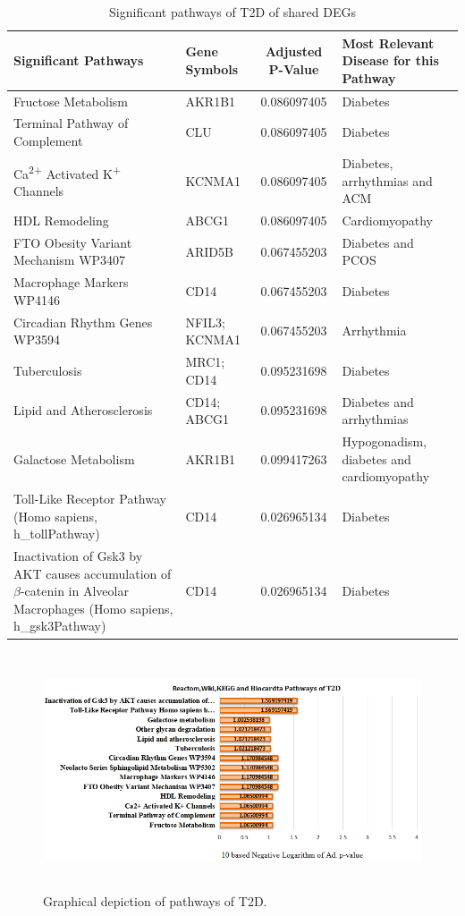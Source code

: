 \begin{table}[H]
\centering
\caption{Significant pathways of T2D of shared DEGs}
\label{tab:T2D_pathways}
\renewcommand{\arraystretch}{1.2} %
\small
\begin{tabularx}{\textwidth}{|X|X|c|X|}
\hline
\textbf{Significant Pathways} & \textbf{Gene Symbols} & \textbf{Adjusted P-Value} & \textbf{Most Relevant Disease for this Pathway} \\
\hline
Fructose Metabolism & AKR1B1 & 0.086097405 & Diabetes \\
\hline
Terminal Pathway of Complement & CLU & 0.086097405 & Diabetes \\
\hline
Ca\textsuperscript{2+} Activated K\textsuperscript{+} Channels & KCNMA1 & 0.086097405 & Diabetes, arrhythmias and ACM \\
\hline
HDL Remodeling & ABCG1 & 0.086097405 & Cardiomyopathy \\
\hline
FTO Obesity Variant Mechanism WP3407 & ARID5B & 0.067455203 & Diabetes and PCOS \\
\hline
Macrophage Markers WP4146 & CD14 & 0.067455203 & Diabetes \\
\hline
Circadian Rhythm Genes WP3594 & NFIL3; KCNMA1 & 0.067455203 & Arrhythmia \\
\hline
Tuberculosis & MRC1; CD14 & 0.095231698 & Diabetes \\
\hline
Lipid and Atherosclerosis & CD14; ABCG1 & 0.095231698 & Diabetes and arrhythmias \\
\hline
Galactose Metabolism & AKR1B1 & 0.099417263 & Hypogonadism, diabetes and cardiomyopathy \\
\hline
Toll-Like Receptor Pathway (Homo sapiens, h\_tollPathway) & CD14 & 0.026965134 & Diabetes \\
\hline
Inactivation of Gsk3 by AKT causes accumulation of $\beta$-catenin in Alveolar Macrophages (Homo sapiens, h\_gsk3Pathway) & CD14 & 0.026965134 & Diabetes \\
\hline
\end{tabularx}
\end{table}

\begin{figure}[H]
\centering
\includegraphics[height=7cm]{./fig/fig4_7.png} 
\centering
\caption{ Graphical depiction of   pathways of T2D.}
\label{ Graphical depiction of   pathways of T2D.}
\end{figure}

